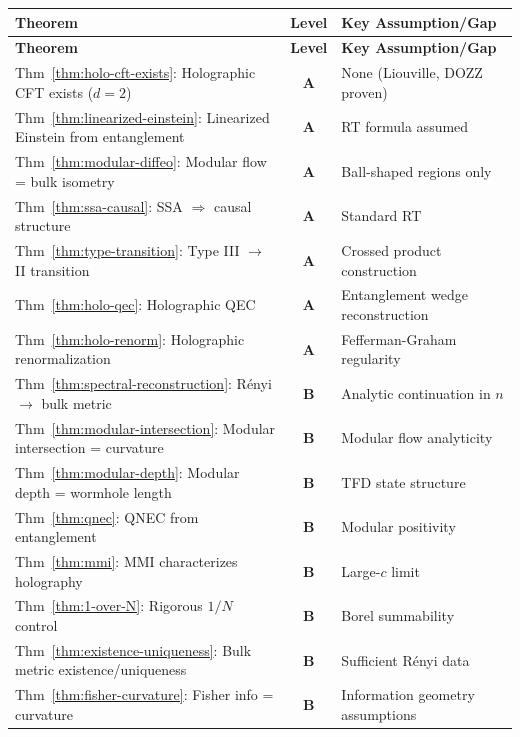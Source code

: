 \documentclass[12pt,a4paper]{article}
\begin{document}
\begin{center}
\renewcommand{\arraystretch}{1.2}
\small
\begin{longtable}{|p{5.5cm}|c|p{6cm}|}
\hline
\textbf{Theorem} & \textbf{Level} & \textbf{Key Assumption/Gap} \\
\hline
\endfirsthead
\hline
\textbf{Theorem} & \textbf{Level} & \textbf{Key Assumption/Gap} \\
\hline
\endhead
\hline
\endfoot
Thm~\ref{thm:holo-cft-exists}: Holographic CFT exists ($d=2$) & \textbf{A} & None (Liouville, DOZZ proven) \\
\hline
Thm~\ref{thm:linearized-einstein}: Linearized Einstein from entanglement & \textbf{A} & RT formula assumed \\
\hline
Thm~\ref{thm:modular-diffeo}: Modular flow = bulk isometry & \textbf{A} & Ball-shaped regions only \\
\hline
Thm~\ref{thm:ssa-causal}: SSA $\Rightarrow$ causal structure & \textbf{A} & Standard RT \\
\hline
Thm~\ref{thm:type-transition}: Type III $\to$ II transition & \textbf{A} & Crossed product construction \\
\hline
Thm~\ref{thm:holo-qec}: Holographic QEC & \textbf{A} & Entanglement wedge reconstruction \\
\hline
Thm~\ref{thm:holo-renorm}: Holographic renormalization & \textbf{A} & Fefferman-Graham regularity \\
\hline
Thm~\ref{thm:spectral-reconstruction}: R\'enyi $\to$ bulk metric & \textbf{B} & Analytic continuation in $n$ \\
\hline
Thm~\ref{thm:modular-intersection}: Modular intersection = curvature & \textbf{B} & Modular flow analyticity \\
\hline
Thm~\ref{thm:modular-depth}: Modular depth = wormhole length & \textbf{B} & TFD state structure \\
\hline
Thm~\ref{thm:qnec}: QNEC from entanglement & \textbf{B} & Modular positivity \\
\hline
Thm~\ref{thm:mmi}: MMI characterizes holography & \textbf{B} & Large-$c$ limit \\
\hline
Thm~\ref{thm:1-over-N}: Rigorous $1/N$ control & \textbf{B} & Borel summability \\
\hline
Thm~\ref{thm:existence-uniqueness}: Bulk metric existence/uniqueness & \textbf{B} & Sufficient R\'enyi data \\
\hline
Thm~\ref{thm:fisher-curvature}: Fisher info = curvature & \textbf{B} & Information geometry assumptions \\

\end{longtable}
\end{center}
\end{document}
